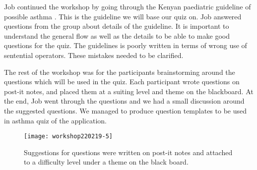 Job continued the workshop by going through the Kenyan paediatric guideline of possible asthma \parencite{RepublicofKeny2016}. This is the guideline we will base our quiz on. Job answered questions from the group about details of the guideline. It is important to understand the general flow as well as the details to be able to make good questions for the quiz. The guidelines is poorly written in terms of wrong use of sentential operators. These mistakes needed to be clarified.

The rest of the workshop was for the participants brainstorming around the questions which will be used in the quiz. Each participant wrote questions on post-it notes, and placed them at a suiting level and theme on the blackboard. At the end, Job went through the questions and we had a small discussion around the suggested questions. We managed to produce question templates to be used in asthma quiz of the application.

\begin{figure}[h!]
	\caption {Suggestions for questions were written on post-it notes and attached to a difficulty level under a theme on the black board.}
	\texttt{[image: workshop220219-5]}
\end{figure}